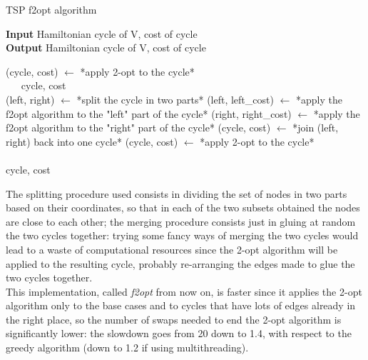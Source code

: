 \begin{algorithm}
    \caption{TSP f2opt algorithm}

    \textbf{Input} Hamiltonian cycle of V, cost of cycle\\
    \textbf{Output} Hamiltonian cycle of V, cost of cycle\\
    \begin{algorithmic}

            \State (cycle, cost) $\gets$ *apply 2-opt to the cycle*\\
            $\quad\;\;$\Return cycle, cost
        \EndIf\\

            \State (left, right) $\gets$ *split the cycle in two parts*
            \State (left, left\_cost) $\gets$ *apply the f2opt algorithm to the "left" part of the cycle*
            \State (right, right\_cost) $\gets$ *apply the f2opt algorithm to the "right" part of the cycle*
            \State (cycle, cost) $\gets$ *join (left, right) back into one cycle*
            \State (cycle, cost) $\gets$ *apply 2-opt to the cycle*
        \EndWhile\\\\

        \Return cycle, cost

    \end{algorithmic}
\end{algorithm}

\newpage

The splitting procedure used consists in dividing the set of nodes in two parts based on their coordinates, so that in each of the two subsets obtained the nodes are close to each other; the merging procedure consists just in gluing at random the two cycles together: trying some fancy ways of merging the two cycles would lead to a waste of computational resources since the 2-opt algorithm will be applied to the resulting cycle, probably re-arranging the edges made to glue the two cycles together.\\

This implementation, called \textit{f2opt} from now on, is faster since it applies the 2-opt algorithm only to the base cases and to cycles that have lots of edges already in the right place, so the number of swaps needed to end the 2-opt algorithm is significantly lower: the slowdown goes from 20 down to 1.4, with respect to the greedy algorithm (down to 1.2 if using multithreading).

